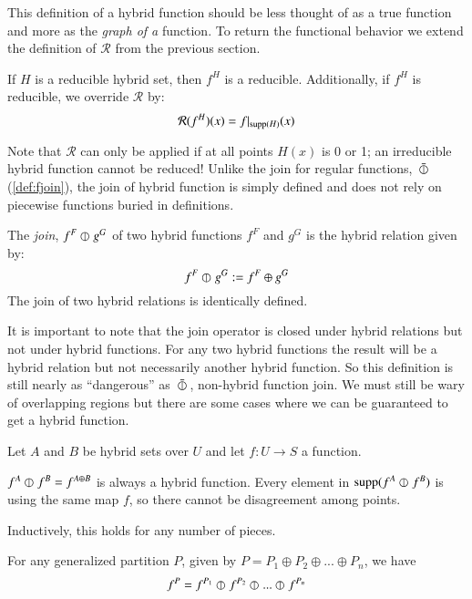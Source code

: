 This definition of a hybrid function should be less thought of as a true function and more as the \emph{graph of a} function.
To return the functional behavior we extend the definition of $\mathcal{R}$ from the previous section.

\begin{definition}
If $H$ is a reducible hybrid set, then $f^H$ is a reducible. Additionally, if $f^H$ is reducible, we override $\mathcal{R}$ by:
\begin{equation}
\mathcal{R}(f^H)(x) = f|_{\text{supp}(H)}(x)
\end{equation}
\end{definition}

Note that $\mathcal{R}$ can only be applied if at all points $H(x)$ is 0 or 1; 
an irreducible hybrid function cannot be reduced!
Unlike the join for regular functions, $\,\bar{\varobar}\,$ (\ref{def:fjoin}), the join of hybrid function is simply defined and does not rely on piecewise functions buried in definitions.

\begin{definition}
The \emph{join}, $f^F \varobar^{} g^G$ of two hybrid functions $f^F$ and $g^G$ is the hybrid relation given by:
\begin{equation}
\label{def:hjoin}
f^F \varobar^{} g^G := f^F \oplus g^G
\end{equation}
The join of two hybrid relations is identically defined.
\end{definition}

It is important to note that the join operator is closed under hybrid relations but not under hybrid functions.
For any two hybrid functions the result will be a hybrid relation but not necessarily another hybrid function.
So this definition is still nearly as ``dangerous'' as  $\,\bar{\varobar}\,$, non-hybrid function join. 
We must still be wary of overlapping regions but there are some cases where we can be guaranteed to get a hybrid function.


Let $A$ and $B$ be hybrid sets over $U$ and let $f: U \to S$ a function.

$f^A \varobar^{} f^B = f^{A \oplus B}$ is always a hybrid function. 
Every element in $\text{supp}(f^A \varobar^{} f^B)$ is using the same map $f$, so there cannot be disagreement among points.

Inductively, this holds for any number of pieces.

For any generalized partition $P$, given by $P = P_1 \oplus P_2 \oplus ... \oplus P_n$, we have
\begin{equation}
 f^P = f^{P_1} \varobar^{} f^{P_2} \varobar^{} ... \varobar^{} f^{P_n}
\end{equation}

